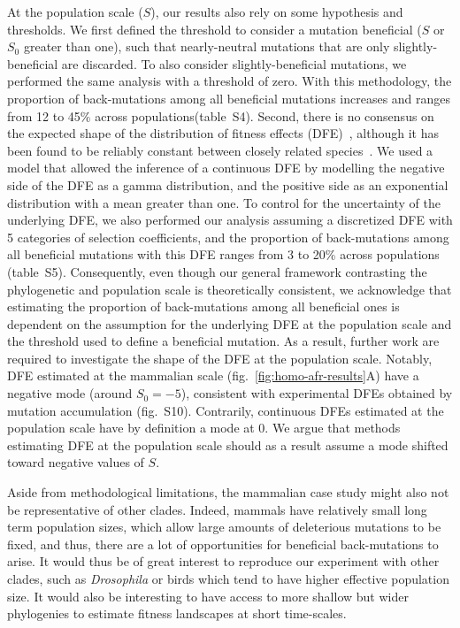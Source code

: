 \documentclass{article}
\newcommand{\Sphy}{S_{0}}
\newcommand{\Spop}{S}
\begin{document}
    At the population scale ($\Spop$), our results also rely on some hypothesis and thresholds.
    We first defined the threshold to consider a mutation beneficial ($\Spop$ or $\Sphy$ greater than one), such that nearly-neutral mutations that are only slightly-beneficial are discarded.
    To also consider slightly-beneficial mutations, we performed the same analysis with a threshold of zero.
    With this methodology, the proportion of back-mutations among all beneficial mutations increases and ranges from 12 to 45\% across populations(table~S4).
    Second, there is no consensus on the expected shape of the distribution of fitness effects (DFE)~\cite{welch_divergence_2008, bataillon_effects_2014}, although it has been found to be reliably constant between closely related species~\cite{castellano_comparison_2019}.
    We used a model that allowed the inference of a continuous DFE by modelling the negative side of the DFE as a gamma distribution, and the positive side as an exponential distribution with a mean greater than one.
    To control for the uncertainty of the underlying DFE, we also performed our analysis assuming a discretized DFE with 5 categories of selection coefficients, and the proportion of back-mutations among all beneficial mutations with this DFE ranges from 3 to 20\% across populations (table~S5).
    Consequently, even though our general framework contrasting the phylogenetic and population scale is theoretically consistent, we acknowledge that estimating the proportion of back-mutations among all beneficial ones is dependent on the assumption for the underlying DFE at the population scale and the threshold used to define a beneficial mutation.
    As a result, further work are required to investigate the shape of the DFE at the population scale.
    Notably, DFE estimated at the mammalian scale (fig.~\ref{fig:homo-afr-results}A) have a negative mode (around $\Sphy=-5$), consistent with experimental DFEs obtained by mutation accumulation (fig.~S10).
    Contrarily, continuous DFEs estimated at the population scale have by definition a mode at 0.
    We argue that methods estimating DFE at the population scale should as a result assume a mode shifted toward negative values of $\Spop$.

    Aside from methodological limitations, the mammalian case study might also not be representative of other clades.
    Indeed, mammals have relatively small long term population sizes, which allow large amounts of deleterious mutations to be fixed, and thus, there are a lot of opportunities for beneficial back-mutations to arise.
    It would thus be of great interest to reproduce our experiment with other clades, such as \textit{Drosophila} or birds which tend to have higher effective population size.
    It would also be interesting to have access to more shallow but wider phylogenies to estimate fitness landscapes at short time-scales.
\end{document}
